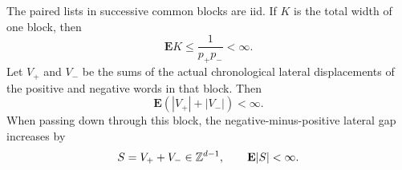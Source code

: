 \begin{lemma}\label{lem:common-blocks}
The paired lists in successive common blocks are iid.  If $K$ is
the total width of one block, then
\begin{equation}\label{eq:common-width-moment}
 \mathbf E K\le\frac{1}{p_+p_-}<\infty.
\end{equation}
Let $V_+$ and $V_-$ be the sums of the actual chronological
lateral displacements of the positive and negative words in that
block.  Then
\begin{equation}\label{eq:common-lateral-moment}
 \mathbf E(|V_+|+|V_-|)<\infty.
\end{equation}
When passing down through this block, the negative-minus-positive
lateral gap increases by
\[
 S=V_++V_-\in\mathbb Z^{d-1},\qquad \mathbf E|S|<\infty.
\]
\end{lemma}

